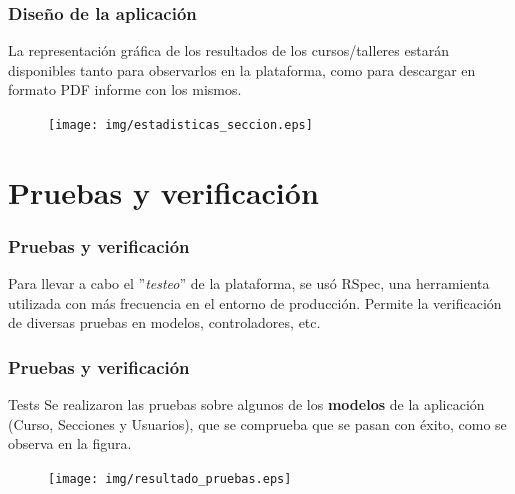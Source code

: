 \documentclass{beamer}
\begin{document}
\begin{frame}
\frametitle{Diseño de la aplicación}

La representación gráfica de los resultados de los cursos/talleres estarán disponibles tanto para observarlos en la plataforma, como para descargar en formato PDF informe con los mismos.

\begin{figure}
    \texttt{[image: img/estadisticas\_seccion.eps]}
\end{figure}

\end{frame}


\section{Pruebas y verificación}
\begin{frame}
\frametitle{Pruebas y verificación}

Para llevar a cabo el ''\textit{testeo}'' de la plataforma, se usó RSpec, una herramienta utilizada con más frecuencia en el entorno de producción. Permite la verificación de diversas pruebas en modelos,
controladores, etc.

\begin{figure}[!th]%
    \centering
    \qquad
\end{figure}

\end{frame}
\begin{frame}
\frametitle{Pruebas y verificación}

\begin{exampleblock}{Tests}
    Se realizaron las pruebas sobre algunos de los \textbf{modelos} de la aplicación (Curso, Secciones y Usuarios), que se comprueba que se pasan con éxito, como se observa en la figura.
\end{exampleblock}

\begin{figure}
    \texttt{[image: img/resultado\_pruebas.eps]}
\end{figure}

\end{frame}
\end{document}

